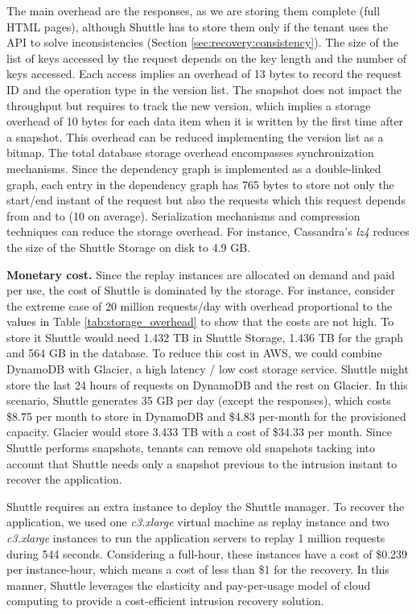 \documentclass[10pt,conference]{IEEEtran}
\newcommand{\LONG}[1]{}
\begin{document}
The main overhead are the responses, as we are storing them complete (full HTML pages), although  Shuttle has to store them only if the tenant uses the API to solve inconsistencies (Section \ref{sec:recovery:consistency}). The size of the list of keys accessed by the request depends on the key length and the number of keys accessed. Each access implies an overhead of 13 bytes to record the request ID and the operation type in the version list. The snapshot does not impact the throughput but requires to track the new version, which implies a storage overhead of 10 bytes for each data item when it is written by the first time after a snapshot. This overhead can be reduced implementing the version list as a bitmap. The total database storage overhead encompasses synchronization mechanisms. Since the dependency graph is implemented as a double-linked graph, each entry in the dependency graph has 765 bytes to store not only the start/end instant of the request but also the requests which this request depends from and to (10 on average). Serialization mechanisms and compression techniques can reduce the storage overhead. For instance, Cassandra's \emph{lz4}\LONG{cite{lz4}} reduces the size of the Shuttle Storage on disk to 4.9 GB.


\textbf{Monetary cost.}
Since the replay instances are allocated on demand and paid per use, the cost of Shuttle is dominated by the storage. 
For instance, consider the extreme case of 20 million requests/day with overhead proportional to the values in Table \ref{tab:storage_overhead} to show that the costs are not high. To store it Shuttle would need 1.432 TB in Shuttle Storage, 1.436 TB for the graph and 564 GB in the database. 
To reduce this cost in AWS, we could combine DynamoDB with Glacier, a high latency / low cost storage service\DIFdelbegin {}\DIFdelend . Shuttle might store the last 24 hours of requests on DynamoDB and the rest on Glacier. In this scenario, Shuttle generates 35 GB per day (except the responses), which costs \$8.75 per month to store in DynamoDB and \$4.83 per-month for the provisioned capacity. Glacier would store 3.433 TB with a cost of \$34.33 per month. Since Shuttle performs snapshots, tenants can remove old snapshots tacking into account that Shuttle needs only a snapshot previous to the intrusion instant to recover the application.
\DIFdelbegin 
\DIFdelend 

Shuttle requires an extra instance to deploy the Shuttle manager. To recover the application, we used one \emph{c3.xlarge} virtual machine as replay instance and two  \emph{c3.xlarge} instances to run the application servers to replay 1 million requests during 544 seconds. Considering a full-hour, these instances have a cost of \$0.239 per instance-hour, which means a cost of less than \$1 for the recovery. In this manner, Shuttle leverages the elasticity and pay-per-usage model of cloud computing to provide a cost-efficient intrusion recovery solution.
\end{document}
